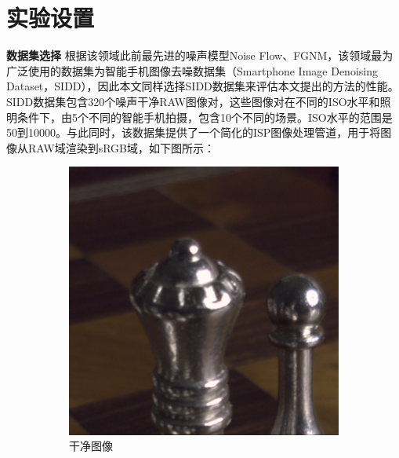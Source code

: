 \section{实验设置}

\noindent\textbf{数据集选择} \quad 根据该领域此前最先进的噪声模型Noise Flow\cite{noiseflow}、FGNM\cite{co}，该领域最为广泛使用的数据集为智能手机图像去噪数据集（Smartphone Image Denoising Dataset，SIDD）\cite{sidd}，因此本文同样选择SIDD数据集来评估本文提出的方法的性能。SIDD数据集包含320个噪声干净RAW图像对，这些图像对在不同的ISO水平和照明条件下，由5个不同的智能手机拍摄，包含10个不同的场景。ISO水平的范围是50到10000。与此同时，该数据集提供了一个简化的ISP图像处理管道，用于将图像从RAW域渲染到sRGB域，如下图所示：

\begin{figure}[htbp]
	\centering
	\begin{subfigure}{0.48\linewidth}
		\centering
		\includegraphics[width=\linewidth]{imgs/gtcut.png}
		\caption{干净图像}
		\label{gt}%
	\end{subfigure}
	\centering
	\begin{subfigure}{0.4835\linewidth}
		\centering

\end{subfigure}
\end{figure}
